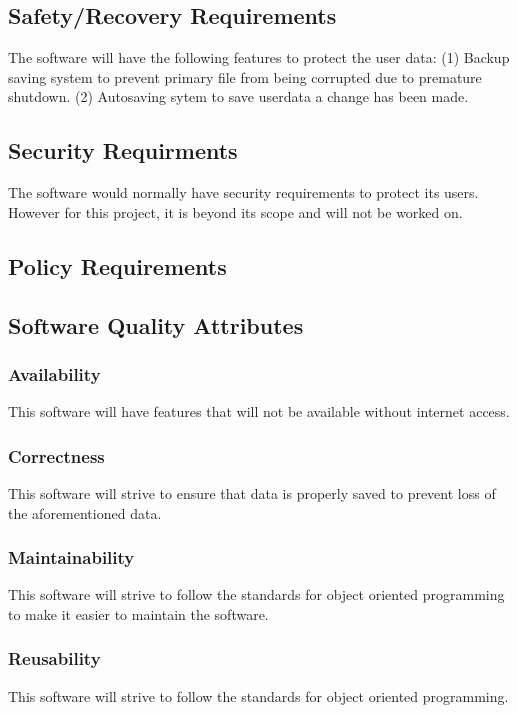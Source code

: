 \documentclass[12pt]{article}
\begin{document}
\subsection{Safety/Recovery
Requirements}\label{safetyrecovery-requirements}

The software will have the following features to protect the user data:
(1) Backup saving system to prevent primary file from being corrupted
due to premature shutdown. (2) Autosaving sytem to save userdata a
change has been made. 

\subsection{Security Requirments} The software would
normally have security requirements to protect its users. However for
this project, it is beyond its scope and will not be worked on. 

\subsection{Policy Requirements}

\subsection{Software Quality
Attributes}\label{software-quality-attributes}

\subsubsection{Availability}\label{availability}

This software will have features that will not be available without
internet access. 
\subsubsection{Correctness} This software will strive to ensure
that data is properly saved to prevent loss of the aforementioned data.
\subsubsection{Maintainability} This software will strive to follow the standards
for object oriented programming to make it easier to maintain the
software. 
\subsubsection{Reusability}
 This software will strive to follow the standards for object oriented programming. 
\end{document}
